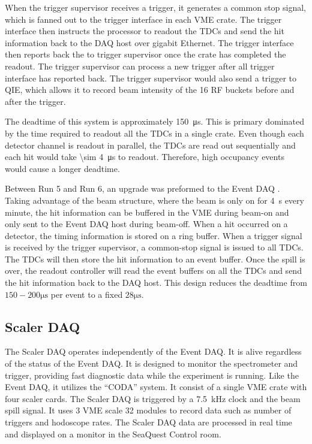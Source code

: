 \documentclass[../main.tex]{subfiles}
\begin{document}
When the trigger supervisor receives a trigger, it generates a common stop signal, which is fanned out
to the trigger interface in each VME crate. The trigger interface then instructs the processor to readout the TDCs
and send the hit information back to the DAQ host over gigabit Ethernet. The trigger interface then
reports back the to trigger supervisor once the crate has completed the readout. The trigger supervisor can process
a new trigger after all trigger interface has reported back. The trigger supervisor would also send a trigger to QIE,
which allows it to record beam intensity of the 16 RF buckets before and after the trigger.

The deadtime of this system is approximately \SI{150}{\micro\second}. This is primary
dominated by the time required to readout all the TDCs in a single crate. Even though
each detector channel is readout in parallel, the TDCs are read out sequentially
and each hit would take \SI{\sim 4}{\micro\second} to readout. Therefore, high occupancy
events would cause a longer deadtime.

Between Run 5 and Run 6, an upgrade was preformed to the Event DAQ \cite{Kun-1724}.
Taking advantage of the beam structure, where the beam is only on for \SI{4}{\s} every minute,
the hit information can be buffered in the VME during beam-on and only sent to the Event
DAQ host during beam-off. When a hit occurred on a detector,
the timing information is stored on a ring buffer.
When a trigger signal is received by the trigger supervisor,
a common-stop signal is issued to all TDCs. The TDCs will then store the hit information
to an event buffer. Once the spill is over, the readout controller will read the event
buffers on all the TDCs and send the hit information back to the DAQ host.
This design reduces the deadtime from $150 -200\unit{\micro\second}$ per event to a fixed $28\unit{\micro\second}$.

\subsection{Scaler DAQ}
The Scaler DAQ operates independently of the Event DAQ.
It is alive regardless of the status of the Event DAQ.
It is designed to monitor the spectrometer and trigger,
providing fast diagnostic data while the experiment is running. Like the Event DAQ,
it utilizes the ``CODA'' system. It consist of a single VME crate with four scaler
cards. The Scaler DAQ is triggered by a \SI{7.5}{\kilo\hertz} clock and the beam
spill signal. It uses 3 VME scale 32 modules to record data such as number of triggers
and hodoscope rates. The Scaler DAQ data are processed in real time and displayed
on a monitor in the SeaQuest Control room.
\end{document}
